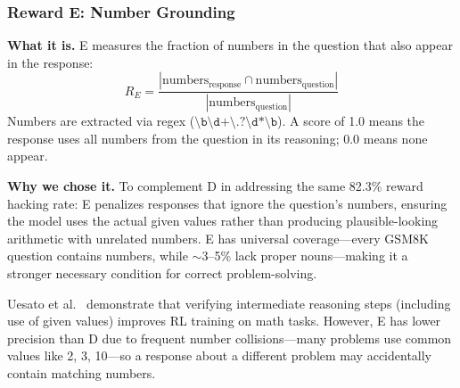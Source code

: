 \subsubsection{Reward E: Number Grounding}
\nestindent

\textbf{What it is.}
E measures the fraction of numbers in the question that also appear in the response:
\[
R_E = \frac{|\text{numbers}_\text{response} \cap \text{numbers}_\text{question}|}{|\text{numbers}_\text{question}|}
\]
Numbers are extracted via regex ($\texttt{\textbackslash b\textbackslash d+\textbackslash .?\textbackslash d*\textbackslash b}$).
A score of 1.0 means the response uses all numbers from the question in its reasoning; 0.0 means none appear.

\textbf{Why we chose it.}
To complement D in addressing the same 82.3\% reward hacking rate: E penalizes responses that ignore the question's numbers, ensuring the model uses the actual given values rather than producing plausible-looking arithmetic with unrelated numbers.
E has universal coverage---every GSM8K question contains numbers, while $\sim$3--5\% lack proper nouns---making it a stronger necessary condition for correct problem-solving.

Uesato et al.~\cite{uesato2022solving} demonstrate that verifying intermediate reasoning steps (including use of given values) improves RL training on math tasks.
However, E has lower precision than D due to frequent number collisions---many problems use common values like 2, 3, 10---so a response about a different problem may accidentally contain matching numbers.
\nestunindent
